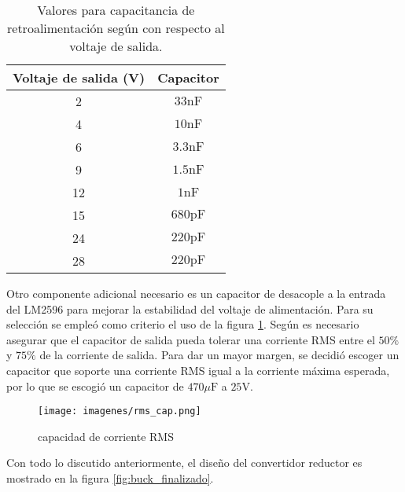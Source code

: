         \begin{table}[H]
            \centering
            \begin{tabular}{|c|c|}
                \hline
                Voltaje de salida (V) & Capacitor \\
                \hline
                2 & $33\text{nF}$ \\
                4 & $10\text{nF}$ \\
                6 & $3.3\text{nF}$ \\
                9 & $1.5\text{nF}$ \\
                12 & $1\text{nF}$ \\
                15 & $680\text{pF}$ \\
                24 & $220\text{pF}$ \\
                28 & $220\text{pF}$ \\
                \hline
            \end{tabular}
            \caption{Valores para capacitancia de retroalimentación según \cite{lm2596}
                con respecto al voltaje de salida.}
            \label{tb:feedforward_cap}
        \end{table}



        Otro componente adicional necesario es un capacitor de desacople a la entrada
        del LM2596 para mejorar la estabilidad del voltaje de alimentación. Para su
        selección se empleó como criterio el uso de la figura \ref{fig:rms_cap}. Según
        \cite{lm2596} es necesario asegurar que el capacitor de salida pueda tolerar
        una corriente RMS entre el $50\%$ y $75\%$ de la corriente de salida.
        Para dar un mayor margen, se decidió escoger un capacitor que soporte una corriente
        RMS igual a la corriente máxima esperada, por lo que se escogió un capacitor
        de $470\mu\text{F}$ a $25\text{V}$.

        \begin{figure}[H]
            \centering

            \texttt{[image: imagenes/rms\_cap.png]}
            \caption{capacidad de corriente RMS}
            \label{fig:rms_cap}

        \end{figure}

        Con todo lo discutido anteriormente, el diseño del convertidor reductor es mostrado
        en la figura \ref{fig:buck_finalizado}.

